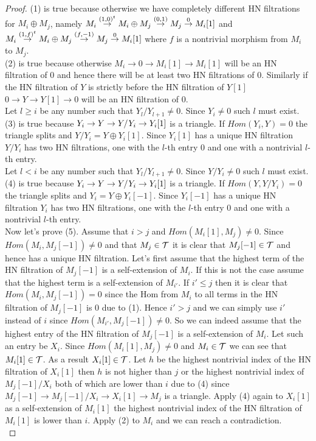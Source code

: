 \begin{proof}
\indent (1) is true because otherwise we have completely different HN filtrations for $M_i\oplus M_j$, namely $M_i\overset{(1,0)^t}{\to} M_i\oplus M_j\overset{(0,1)}{\to} M_j\overset{0}{\to} M_i[1]$ and $M_i\overset{(1,f)^t}{\to} M_i\oplus M_j\overset{(f,-1)}{\to} M_j\overset{0}{\to} M_i[1]$ where $f$ is a nontrivial morphism from $M_i$ to $M_j$.\\
\indent (2) is true because otherwise $M_i\to 0\to M_i[1]\to M_i[1]$ will be an HN filtration of 0 and hence there will be at least two HN filtrations of 0. Similarly if the HN filtration of $Y$ is strictly before the HN filtration of $Y[1]$ $0\to Y\to Y[1]\to 0$ will be an HN filtration of 0.\\
\indent Let $l \geq i$ be any number such that $Y_l/Y_{l+1}\neq 0$. Since $Y_i\neq 0$ such $l$ must exist. (3) is true because $Y_i\to Y\to Y/Y_i\to Y_i[1]$ is a triangle. If $Hom(Y_i,Y)= 0$ the triangle splits and $Y/Y_i = Y\oplus Y_i[1]$. Since $Y_i[1]$ has a unique HN filtration $Y/Y_i$ has two HN filtrations, one with the $l$-th entry 0 and one with a nontrivial $l$-th entry. \\
\indent Let $l < i$ be any number such that $Y_l/Y_{l+1}\neq 0$. Since $Y/Y_i\neq 0$ such $l$ must exist. (4) is true because $Y_i\to Y\to Y/Y_i\to Y_i[1]$ is a triangle. If $Hom(Y,Y/Y_i)= 0$ the triangle splits and $Y_i = Y\oplus Y_i[-1]$. Since $Y_i[-1]$ has a unique HN filtration $Y_i$ has two HN filtrations, one with the $l$-th entry 0 and one with a nontrivial $l$-th entry. \\
\indent Now let's prove (5). Assume that $i>j$ and $Hom(M_i[1],M_j) \neq 0$. Since $Hom(M_i,M_j[-1])\neq 0$ and that $M_j\in\mathcal{T}$ it is clear that $M_j[-1]\in\mathcal{T}$ and hence has a unique HN filtration. Let's first assume that the highest term of the HN filtration of $M_j[-1]$ is a self-extension of $M_i$. If this is not the case assume that the highest term is a self-extension of $M_{i'}$. If $i'\leq j$ then it is clear that $Hom(M_i,M_j[-1])=0$ since the Hom from $M_i$ to all terms in the HN filtration of $M_j[-1]$ is 0 due to (1). Hence $i'>j$ and we can simply use $i'$ instead of $i$ since $Hom(M_{i'},M_j[-1])\neq 0$. So we can indeed assume that the highest entry of the HN filtration of $M_j[-1]$ is a self-extension of $M_i$. Let such an entry be $X_i$. Since $Hom(M_i[1], M_j)\neq 0$ and $M_i\in\mathcal{T}$ we can see that $M_i[1]\in\mathcal{T}$. As a result $X_i[1]\in\mathcal{T}$. Let $h$ be the highest nontrivial index of the HN filtration of $X_i[1]$ then $h$ is not higher than $j$ or the highest nontrivial index of $M_j[-1]/X_i$ both of which are lower than $i$ due to (4) since $M_j[-1]\to M_j[-1]/X_i\to X_i[1]\to M_j$ is a triangle. Apply (4) again to $X_i[1]$ as a self-extension of $M_i[1]$ the highest nontrivial index of the HN filtration of $M_i[1]$ is lower than $i$. Apply (2) to $M_i$ and we can reach a contradiction.\\

\end{proof}
